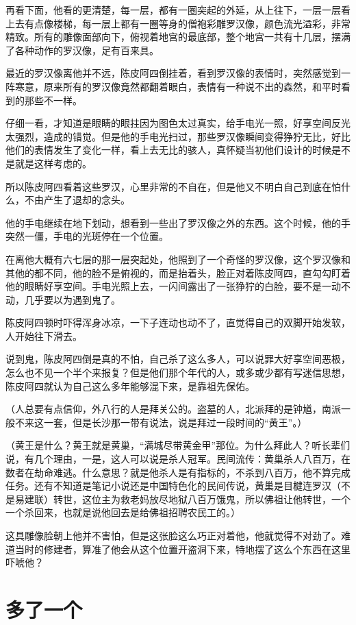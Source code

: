 再看下面，他看的更清楚，每一层，都有一圈突起的外延，从上往下，一层一层看上去有点像楼梯，每一层上都有一圈等身的僧袍彩雕罗汉像，颜色流光溢彩，非常精致。所有的雕像面部向下，俯视着地宫的最底部，整个地宫一共有十几层，摆满了各种动作的罗汉像，足有百来具。

最近的罗汉像离他并不远，陈皮阿四倒挂着，看到罗汉像的表情时，突然感觉到一阵寒意，原来所有的罗汉像竟然都翻着眼白，表情有一种说不出的森然，和平时看到的那些不一样。

仔细一看，才知道是眼睛的眼拄因为图色太过真实，给手电光一照，好享空间反光太强烈，造成的错觉。但是他的手电光扫过，那些罗汉像瞬间变得狰狞无比，好比他们的表情发生了变化一样，看上去无比的骇人，真怀疑当初他们设计的时候是不是就是这样考虑的。

所以陈皮阿四看着这些罗汉，心里非常的不自在，但是他又不明白自己到底在怕什么，不由产生了退却的念头。

他的手电继续在地下划动，想看到一些出了罗汉像之外的东西。这个时候，他的手突然一僵，手电的光斑停在一个位置。

在离他大概有六七层的那一层突起处，他照到了一个奇怪的罗汉像，这个罗汉像和其他的都不同，他的脸不是俯视的，而是抬着头，脸正对着陈皮阿四，直勾勾盯着他的眼睛好享空间。手电光照上去，一闪间露出了一张狰狞的白脸，要不是一动不动，几乎要以为遇到鬼了。

陈皮阿四顿时吓得浑身冰凉，一下子连动也动不了，直觉得自己的双脚开始发软，人开始往下滑去。

说到鬼，陈皮阿四倒是真的不怕，自己杀了这么多人，可以说罪大好享空间恶极，怎么也不见一个半个来报复？但是他们那个年代的人，或多或少都有写迷信思想，陈皮阿四就认为自己这么多年能够混下来，是靠祖先保佑。

（人总要有点信仰，外八行的人是拜关公的。盗墓的人，北派拜的是钟馗，南派一般不来这一套，但是长沙那一带有说法，说是拜过一段时间的“黄王”。）

（黄王是什么？黄王就是黄巢，“满城尽带黄金甲”那位。为什么拜此人？听长辈们说，有几个理由，一是，这人可以说是杀人冠军。民间流传：黄巢杀人八百万，在数者在劫命难逃。什么意思？就是他杀人是有指标的，不杀到八百万，他不算完成任务。还有不知道是笔记小说还是中国特色化的民间传说，黄巢是目楗连罗汉（不是易建联）转世，这位主为救老妈放尽地狱八百万饿鬼，所以佛祖让他转世，一个一个杀回来，也就是说他回去是给佛祖招聘农民工的。）

这具雕像脸朝上他并不害怕，但是这张脸这么巧正对着他，他就觉得不对劲了。难道当时的修建者，算准了他会从这个位置开盗洞下来，特地摆了这么个东西在这里吓唬他？

\chapter{多了一个}

